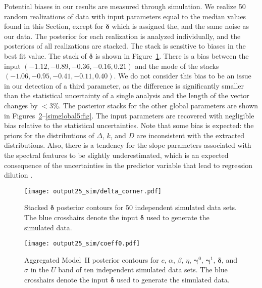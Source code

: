 \documentclass{aastex61}   	%
\begin{document}
Potential biases in our results are measured through simulation.
We realize 50 random realizations of data with input  parameters equal to the median values found in
this Section, except for $\pmb{\delta}$ which is assigned the, and the same noise as our data.  The posterior for each realization is analyzed individually, and the posteriors of all realizations are stacked.  The stack is sensitive to
biases in the best fit value.
The stack of  $\pmb{\delta}$  is shown in Figure~\ref{simdelta:fig}.  There is a bias between
the input  $(-1.12, -0.89, -0.36,  -0.16, 0.21)$ and the mode of  the stacks $(-1.06, -0.95, -0.41, -0.11, 0.40)$.
We do not consider this bias to be an issue in our detection of a third parameter, as the difference is significantly
smaller than the statistical uncertainty of a single analysis and the length of the vector changes by $< 3\%$.
The posterior stacks for the other global parameters 
are shown in Figures~\ref{simglobal1:fig}--\ref{simglobal5:fig}.  The input parameters are recovered with negligible bias
relative to the statistical uncertainties. 
Note that some bias is expected: the priors for the distributions of $\Delta$, $k$, and $D$ are inconsistent
with the extracted distributions.  Also, 
there is a tendency for the slope parameters associated with the spectral features to be slightly underestimated, which is an expected consequence of 
the uncertainties in the predictor variable that lead to 
regression dilution \citep{spearman04}.

\begin{figure}[htbp] %
   \centering
   \texttt{[image: output25\_sim/delta\_corner.pdf]} 
            \caption{Stacked $\pmb{\delta}$ posterior contours for 50 independent simulated data sets.
            The blue crosshairs denote the input $\pmb{\delta}$ used to generate the simulated data.
            \label{simdelta:fig}}
\end{figure}


\begin{figure}[htbp] %
   \centering
   \texttt{[image: output25\_sim/coeff0.pdf]} 
            \caption{Aggregated Model~II posterior contours for $c$, $\alpha$, $\beta$, $\eta$, $\pmb{\gamma}^0$, $\pmb{\gamma}^1$,  $\pmb{\delta}$, and $\sigma$ in the $U$ band of ten independent simulated data sets.  The blue crosshairs denote the input $\pmb{\delta}$ used to generate the simulated data.
            \label{simglobal1:fig}}
\end{figure}
\end{document}
